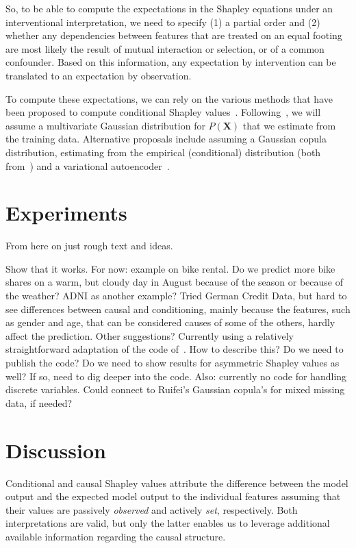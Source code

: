 \documentclass{article}
\newcommand{\vX}{\mathbf{X}}
\newcommand{\comment}[1]{{\color{red} #1}}
\begin{document}
So, to be able to compute the expectations in the Shapley equations under an interventional interpretation, we need to specify (1) a partial order and (2) whether any dependencies between features that are treated on an equal footing are most likely the result of mutual interaction or selection, or of a common confounder. Based on this information, any expectation by intervention can be translated to an expectation by observation.

To compute these expectations, we can rely on the various methods that have been proposed to compute conditional Shapley values~\cite{aas2019explaining,frye2019asymmetric}. Following~\cite{aas2019explaining}, we will assume a multivariate Gaussian distribution for $P(\vX)$ that we estimate from the training data. Alternative proposals include assuming a Gaussian copula distribution, estimating from the empirical (conditional) distribution (both from~\cite{aas2019explaining}) and a variational autoencoder~\cite{frye2019asymmetric}.

\section{Experiments}

\comment{From here on just rough text and ideas.}

Show that it works. For now: example on bike rental. Do we predict more bike shares on a warm, but cloudy day in August because of the season or because of the weather? \comment{ADNI as another example? Tried German Credit Data, but hard to see differences between causal and conditioning, mainly because the features, such as gender and age, that can be considered causes of some of the others, hardly affect the prediction. Other suggestions?} \comment{Currently using a relatively straightforward adaptation of the code of~\cite{aas2019explaining}. How to describe this? Do we need to publish the code? Do we need to show results for asymmetric Shapley values as well? If so, need to dig deeper into the code. Also: currently no code for handling discrete variables. Could connect to Ruifei's Gaussian copula's for mixed missing data, if needed?}

\section{Discussion}

Conditional and causal Shapley values attribute the difference between the model output and the expected model output to the individual features assuming that their values are passively {\em observed} and actively {\em set}, respectively. Both interpretations are valid, but only the latter enables us to leverage additional available information regarding the causal structure.
\end{document}
